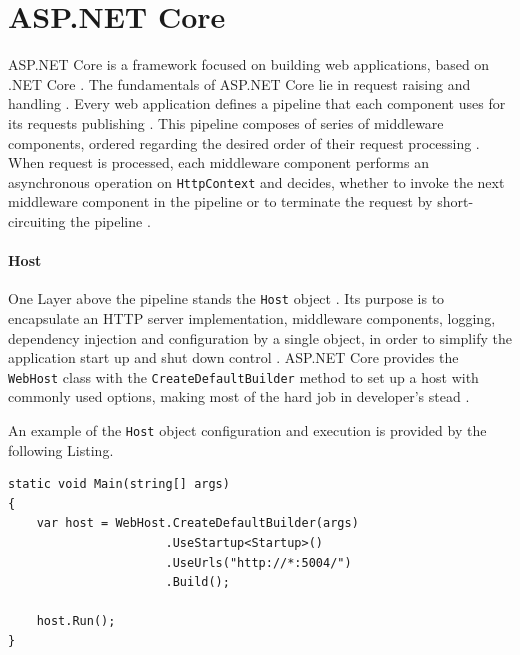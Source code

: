\section{ASP.NET Core}
ASP.NET Core is a framework focused on building web applications, based on .NET Core \citep{microsoft.docs}. The fundamentals of ASP.NET Core lie in request raising and handling \citep{microsoft.docs}. Every web application defines a pipeline that each component uses for its requests publishing \citep{microsoft.docs}. This pipeline composes of series of middleware components, ordered regarding the desired order of their request processing \citep{microsoft.docs}. When request is processed, each middleware component performs an asynchronous operation on \texttt{HttpContext} and decides, whether to invoke the next middleware component in the pipeline or to terminate the request by short-circuiting the pipeline \citep{microsoft.docs}.

\paragraph{Host}
One Layer above the pipeline stands the \texttt{Host} object \citep{microsoft.docs}. Its purpose is to encapsulate an HTTP server implementation, middleware components, logging, dependency injection and configuration by a single object, in order to simplify the application start up and shut down control \citep{microsoft.docs}. ASP.NET Core provides the \texttt{WebHost} class with the \texttt{CreateDefaultBuilder} method to set up a host with commonly used options, making most of the hard job in developer's stead \citep{microsoft.docs}.

An example of the \texttt{Host} object configuration and execution is provided by the following Listing.

\begin{center}
\begin{lstlisting}[caption={Startup.Configure method},captionpos=b]
static void Main(string[] args)
{
	var host = WebHost.CreateDefaultBuilder(args)
					  .UseStartup<Startup>()
					  .UseUrls("http://*:5004/")
					  .Build();

	host.Run();
}
\end{lstlisting}
\end{center}

